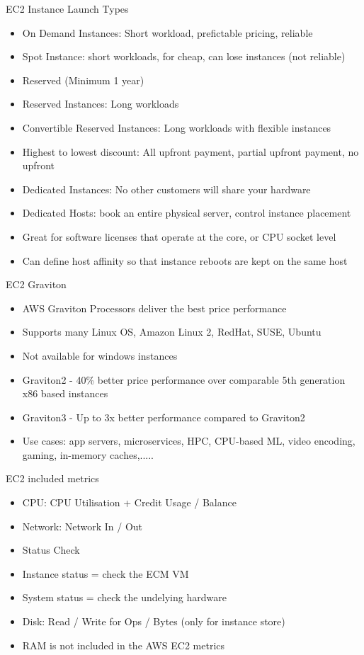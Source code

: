 EC2 Instance Launch Types
\begin{itemize}
    \item On Demand Instances: Short workload, prefictable pricing, reliable
    \item Spot Instance: short workloads, for cheap, can lose instances (not reliable)
    \item Reserved (Minimum 1 year)
    \item Reserved Instances: Long workloads
    \item Convertible Reserved Instances: Long workloads with flexible instances
    \item Highest to lowest discount: All upfront payment, partial upfront payment, no upfront
    \item Dedicated Instances: No other customers will share your hardware
    \item Dedicated Hosts: book an entire physical server, control instance placement
    \item Great for software licenses that operate at the core, or CPU socket level
    \item Can define host affinity so that instance reboots are kept on the same host
\end{itemize}

EC2 Graviton
\begin{itemize}
    \item AWS Graviton Processors deliver the best price performance
    \item Supports many Linux OS, Amazon Linux 2, RedHat, SUSE, Ubuntu
    \item Not available for windows instances
    \item Graviton2 - 40\% better price performance over comparable 5th generation x86 based instances
    \item Graviton3 - Up to 3x better performance compared to Graviton2
    \item Use cases: app servers, microservices, HPC, CPU-based ML, video encoding, gaming, in-memory caches,.....
\end{itemize}

EC2 included metrics
\begin{itemize}
    \item CPU: CPU Utilisation + Credit Usage / Balance
    \item Network: Network In / Out
    \item Status Check
    \item Instance status = check the ECM VM
    \item System status = check the undelying hardware
    \item Disk: Read / Write for Ops / Bytes (only for instance store)
    \item RAM is not included in the AWS EC2 metrics
\end{itemize}

